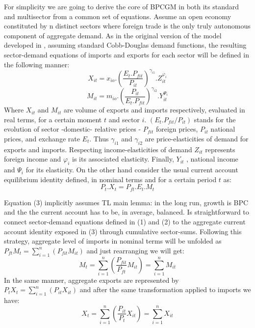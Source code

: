 \documentclass{article}
\begin{document}
For simplicity we are going to derive the core of BPCGM in both its standard and multisector from a common set of equations. Assume an open economy constituted by n distinct sectors where foreign trade is the only truly autonomous component of aggregate demand. As in the original version of the model developed in \cite{thirlwall1979balance}, assuming standard Cobb-Douglas demand functions, the resulting sector-demand equations of imports and exports for each sector will be defined in the following manner:
\begin{equation}
  X_{it}=x_{io}.\left(\frac{E_t.P_{fit}}{P_{it}}\right)^{\gamma _{i1}}.Z_{it}^{\varphi_i}
\end{equation}
\begin{equation}
  M_{it}=m_{io}.\left(\frac{P_{it}}{E_t.P_{fit}}\right)^{\gamma _{i2}}.Y_{it}^{\Psi_i}
\end{equation}
Where  $X_{it}$ and $M_{it}$ are volume of exports and imports respectively, evaluated in real terms, for a certain moment $t$ and sector $i$.  $({E_t.P_{fit}}/{P_{it}})$ stands for the evolution of sector -domestic- relative prices - $P_{fit}$ foreign prices, $P_{it}$ national prices, and exchange rate $E_t$. Thus $\gamma _{i1}$ and $\gamma _{i2}$ are price-elasticities of demand for exports and imports. Respecting income-elasticities of demand $Z_{it}$ represents foreign income and $\varphi_i$ is its associated elasticity. Finally, $Y_{it}$ , national income and $\Psi_i$ for its elasticity. On the other hand consider the usual current account equilibrium identity defined, in nominal terms and for a certain period $t$ as:
\begin{equation}
  P_t.X_t = P_{ft}.E_t.M_t
\end{equation}

Equation (3) implicitly assumes TL main lemma: in the long run, growth is BPC and the the current account has to be, in average, balanced. Is straightforward to connect sector-demand equations defined in (1) and (2) to the  aggregate current account identity exposed in (3) through cumulative sector-sums. Following this strategy, aggregate level of imports in nominal terms will be unfolded as $P_{ft}M_{t} = \sum_{i=1}^{n} ({P_{fit}}M_{it})$ and just rearranging we will get:
\begin{equation}
 M_t = \sum_{i=1}^{n} (\frac{P_{fit}}{P_{ft}}M_{it}) = \sum_{i=1}^{n} M_{it}
\end{equation}
In the same manner, aggregate exports are represented by $P_{t}X_{t} = \sum_{i=1}^{n} ({P_{it}}X_{it})$ and after the same transformation applied to imports we have:
\begin{equation}
 X_t = \sum_{i=1}^{n} (\frac{P_{it}}{P_{t}}X_{it}) = \sum_{i=1}^{n}X_{it}
\end{equation}
\end{document}
